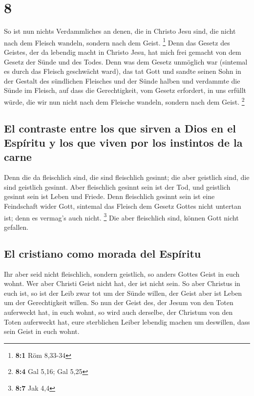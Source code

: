 \hypertarget{section-7}{%
\section{8}\label{section-7}}

 So ist nun nichts Verdammliches an denen, die in Christo
Jesu sind, die nicht nach dem Fleisch wandeln, sondern nach dem Geist.
\footnote{\textbf{8:1} Röm 8,33-34}  Denn das Gesetz des
Geistes, der da lebendig macht in Christo Jesu, hat mich frei gemacht
von dem Gesetz der Sünde und des Todes.  Denn was dem
Gesetz unmöglich war (sintemal es durch das Fleisch geschwächt ward),
das tat Gott und sandte seinen Sohn in der Gestalt des sündlichen
Fleisches und der Sünde halben und verdammte die Sünde im Fleisch,
 auf dass die Gerechtigkeit, vom Gesetz erfordert, in uns
erfüllt würde, die wir nun nicht nach dem Fleische wandeln, sondern nach
dem Geist. \footnote{\textbf{8:4} Gal 5,16; Gal 5,25}

\hypertarget{el-contraste-entre-los-que-sirven-a-dios-en-el-espuxedritu-y-los-que-viven-por-los-instintos-de-la-carne}{%
\subsection{El contraste entre los que sirven a Dios en el Espíritu y
los que viven por los instintos de la
carne}\label{el-contraste-entre-los-que-sirven-a-dios-en-el-espuxedritu-y-los-que-viven-por-los-instintos-de-la-carne}}

 Denn die da fleischlich sind, die sind fleischlich
gesinnt; die aber geistlich sind, die sind geistlich gesinnt.
 Aber fleischlich gesinnt sein ist der Tod, und geistlich
gesinnt sein ist Leben und Friede.  Denn fleischlich
gesinnt sein ist eine Feindschaft wider Gott, sintemal das Fleisch dem
Gesetz Gottes nicht untertan ist; denn es vermag's auch nicht.
\footnote{\textbf{8:7} Jak 4,4}  Die aber fleischlich
sind, können Gott nicht gefallen.

\hypertarget{el-cristiano-como-morada-del-espuxedritu}{%
\subsection{El cristiano como morada del
Espíritu}\label{el-cristiano-como-morada-del-espuxedritu}}

 Ihr aber seid nicht fleischlich, sondern geistlich, so
anders Gottes Geist in euch wohnt. Wer aber Christi Geist nicht hat, der
ist nicht sein.  So aber Christus in euch ist, so ist der
Leib zwar tot um der Sünde willen, der Geist aber ist Leben um der
Gerechtigkeit willen.  So nun der Geist des, der Jesum
von den Toten auferweckt hat, in euch wohnt, so wird auch derselbe, der
Christum von den Toten auferweckt hat, eure sterblichen Leiber lebendig
machen um deswillen, dass sein Geist in euch wohnt.

